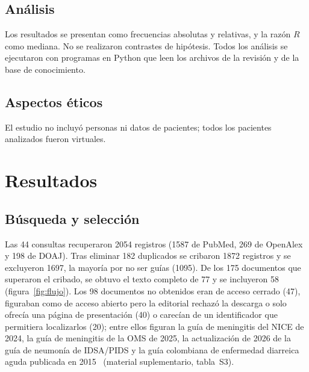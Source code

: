 \documentclass[11pt,a4paper]{article}
\begin{document}
\subsection{Análisis}

Los resultados se presentan como frecuencias absolutas y relativas, y la razón $R$ como mediana. No se realizaron contrastes de hipótesis. Todos los análisis se ejecutaron con programas en Python que leen los archivos de la revisión y de la base de conocimiento.

\subsection{Aspectos éticos}

El estudio no incluyó personas ni datos de pacientes; todos los pacientes analizados fueron virtuales.

\section{Resultados}

\subsection{Búsqueda y selección}

Las 44 consultas recuperaron \num{2054} registros (\num{1587} de PubMed, 269 de OpenAlex y 198 de DOAJ). Tras eliminar 182 duplicados se cribaron \num{1872} registros y se excluyeron \num{1697}, la mayoría por no ser guías (\num{1095}). De los 175 documentos que superaron el cribado, se obtuvo el texto completo de 77 y se incluyeron 58 (figura~\ref{fig:flujo}). Los 98 documentos no obtenidos eran de acceso cerrado (47), figuraban como de acceso abierto pero la editorial rechazó la descarga o solo ofrecía una página de presentación (40) o carecían de un identificador que permitiera localizarlos (20); entre ellos figuran la guía de meningitis del NICE de 2024, la guía de meningitis de la OMS de 2025, la actualización de 2026 de la guía de neumonía de IDSA/PIDS y la guía colombiana de enfermedad diarreica aguda publicada en 2015~\citep{florez2015} (material suplementario, tabla~S3).
\end{document}

